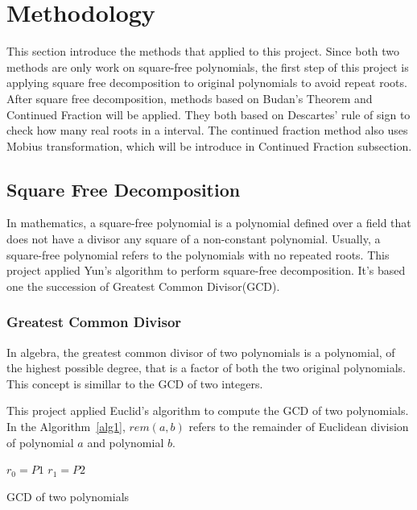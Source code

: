 \section{Methodology}

This section introduce the methods that applied to this project.
Since both two methods are only work on square-free polynomials, the first step
of this project is applying square free decomposition to original polynomials to
avoid repeat roots. After square free decomposition, methods based on Budan's
Theorem and Continued Fraction will be applied. They both based on
Descartes' rule of sign to check how many real roots in a interval. The continued fraction
method also uses Mobius transformation, which will be introduce in Continued Fraction
subsection.

\subsection{Square Free Decomposition} 
In mathematics, a square-free polynomial is a polynomial defined over a field
that does not have a divisor any square of a non-constant
polynomial\cite{Yuns}. Usually, a square-free polynomial refers to the
polynomials with no repeated roots. This project applied Yun's
algorithm\cite{Yuns} to perform square-free decomposition. It's based one the
succession of Greatest Common Divisor(GCD).

\subsubsection{Greatest Common Divisor}

In algebra, the greatest common divisor of two polynomials is a polynomial, 
of the highest possible degree, that is a factor of both the two original
polynomials. This concept is simillar to the GCD of two integers. 

This project applied Euclid's algorithm to compute the GCD of two polynomials.
In the Algorithm~\ref{alg1}, $rem(a,b)$ refers to the remainder of Euclidean division of
polynomial $a$ and polynomial $b$.

\begin{algorithm}[H]
\label{alg1}
\SetAlgoLined


  $r_0 = P1$\;
  $r_1 = P2$\;


\caption{GCD of two polynomials}
\end{algorithm}

